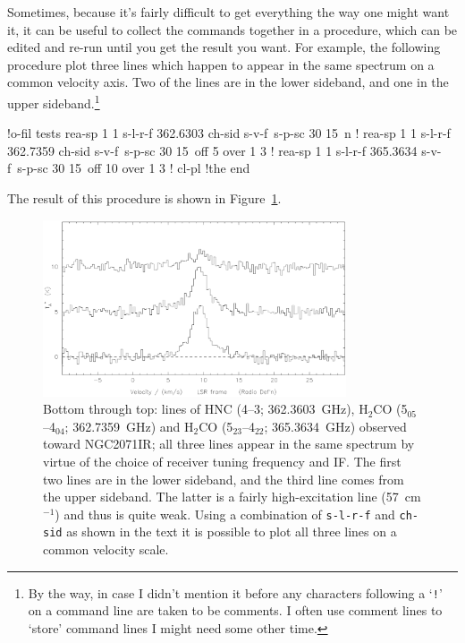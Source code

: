 \documentclass[11pt,twoside]{starlink}
\begin{document}
Sometimes, because it's fairly difficult to get everything the way one
might want it, it can be useful to collect the commands together in a
procedure, which can be edited and re-run until you get the result you
want. For example, the following procedure plot three lines which
happen to appear in the same spectrum on a common velocity axis. Two
of the lines are in the lower sideband, and one in the upper
sideband.\footnote{By the way, in case I didn't mention it before
any characters following a `{\tt{!}}' on a command line are taken to be
comments. I often use comment lines to `store' command lines I might need
some other time.}

\begin{terminalv}
!o-fil tests
rea-sp 1 1
s-l-r-f 362.6303
ch-sid
s-v-f\y\lsr\rad\0\
s-p-sc\n{} 30\n{} 15\
n
!
rea-sp 1 1
s-l-r-f 362.7359
ch-sid
s-v-f\y\lsr\rad\0\
s-p-sc\n{} 30\n{} 15\
off 5
over 1 3
!
rea-sp 1 1
s-l-r-f 365.3634
s-v-f\y\lsr\rad\0\
s-p-sc\n{} 30\n{} 15\
off 10
over 1 3
!
cl-pl
!the end
\end{terminalv}

The result of this procedure is shown in Figure~\ref{fig:s-l-r-f}.

\begin{figure}[htb]
\centering
\includegraphics[width=0.8\textwidth]{sc8_s-l-r-f}
\caption[Using s-l-r-f etc]
{\small{Bottom through top: lines of HNC (4--3; 362.3603~GHz), H$_2$CO
(5$_{05}$--4$_{04}$; 362.7359~GHz) and H$_2$CO (5$_{23}$--4$_{22}$;
365.3634~GHz) observed toward NGC2071IR; all three lines appear in the
same spectrum by virtue of the choice of receiver tuning frequency and
IF. The first two lines are in the lower sideband, and the
third line comes from the upper sideband. The latter is a fairly
high-excitation line (57~cm$^{-1}$) and thus is quite weak. Using a
combination of \texttt{s-l-r-f} and \texttt{ch-sid} as shown in the text it
is possible to plot all three lines on a common velocity scale.
}}
\label{fig:s-l-r-f}
\end{figure}
\end{document}
